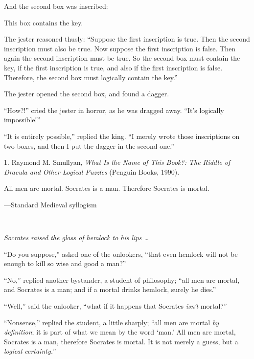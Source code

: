 {
 And the second box was inscribed:}

{
 This box contains the key.}

{
 The jester reasoned thusly: ``Suppose the first
inscription is true. Then the second inscription must also be true. Now
suppose the first inscription is false. Then again the second
inscription must be true. So the second box must contain the key, if
the first inscription is true, and also if the first inscription is
false. Therefore, the second box must logically contain the
key.''}

{
 The jester opened the second box, and found a dagger.}

{
 ``How?!'' cried the jester in
horror, as he was dragged away. ``It's
logically impossible!''}

{
 ``It is entirely possible,''
replied the king. ``I merely wrote those inscriptions
on two boxes, and then I put the dagger in the second
one.''}

\myendsectiontext


\bigskip

{
 1. Raymond M. Smullyan, \textit{What Is the Name of This Book?:
The Riddle of Dracula and Other Logical Puzzles} (Penguin Books,
1990).}


{
 All men are mortal. Socrates is a man. Therefore Socrates is
mortal.}

{\raggedleft
 {}---Standard Medieval syllogism
\par}


\bigskip

{
 ~}

{
 \textit{Socrates raised the glass of hemlock to his lips \ldots}}

{
 ``Do you suppose,'' asked one
of the onlookers, ``that even hemlock will not be
enough to kill so wise and good a man?''}

{
 ``No,'' replied another
bystander, a student of philosophy; ``all men are
mortal, and Socrates is a man; and if a mortal drinks hemlock, surely
he dies.''}

{
 ``Well,'' said the onlooker,
``what if it happens that Socrates
\textit{isn't} mortal?''}

{
 ``Nonsense,'' replied the
student, a little sharply; ``all men are mortal
\textit{by definition}; it is part of what we mean by the word
`man.' All men are mortal, Socrates is a
man, therefore Socrates is mortal. It is not merely a guess, but a
\textit{logical certainty.}''}

